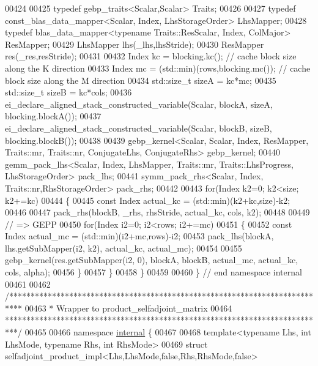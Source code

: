 \begin{DoxyCode}
00424 
00425     \textcolor{keyword}{typedef} gebp\_traits<Scalar,Scalar> Traits;
00426 
00427     \textcolor{keyword}{typedef} const\_blas\_data\_mapper<Scalar, Index, LhsStorageOrder> LhsMapper;
00428     \textcolor{keyword}{typedef} blas\_data\_mapper<typename Traits::ResScalar, Index, ColMajor> ResMapper;
00429     LhsMapper lhs(\_lhs,lhsStride);
00430     ResMapper res(\_res,resStride);
00431 
00432     Index kc = blocking.kc();                   \textcolor{comment}{// cache block size along the K direction}
00433     Index mc = (std::min)(rows,blocking.mc());  \textcolor{comment}{// cache block size along the M direction}
00434     std::size\_t sizeA = kc*mc;
00435     std::size\_t sizeB = kc*cols;
00436     ei\_declare\_aligned\_stack\_constructed\_variable(Scalar, blockA, sizeA, blocking.blockA());
00437     ei\_declare\_aligned\_stack\_constructed\_variable(Scalar, blockB, sizeB, blocking.blockB());
00438 
00439     gebp\_kernel<Scalar, Scalar, Index, ResMapper, Traits::mr, Traits::nr, ConjugateLhs, ConjugateRhs> 
      gebp\_kernel;
00440     gemm\_pack\_lhs<Scalar, Index, LhsMapper, Traits::mr, Traits::LhsProgress, LhsStorageOrder> pack\_lhs;
00441     symm\_pack\_rhs<Scalar, Index, Traits::nr,RhsStorageOrder> pack\_rhs;
00442 
00443     \textcolor{keywordflow}{for}(Index k2=0; k2<size; k2+=kc)
00444     \{
00445       \textcolor{keyword}{const} Index actual\_kc = (std::min)(k2+kc,size)-k2;
00446 
00447       pack\_rhs(blockB, \_rhs, rhsStride, actual\_kc, cols, k2);
00448 
00449       \textcolor{comment}{// => GEPP}
00450       \textcolor{keywordflow}{for}(Index i2=0; i2<rows; i2+=mc)
00451       \{
00452         \textcolor{keyword}{const} Index actual\_mc = (std::min)(i2+mc,rows)-i2;
00453         pack\_lhs(blockA, lhs.getSubMapper(i2, k2), actual\_kc, actual\_mc);
00454 
00455         gebp\_kernel(res.getSubMapper(i2, 0), blockA, blockB, actual\_mc, actual\_kc, cols, alpha);
00456       \}
00457     \}
00458   \}
00459 
00460 \} \textcolor{comment}{// end namespace internal}
00461 
00462 \textcolor{comment}{/***************************************************************************}
00463 \textcolor{comment}{* Wrapper to product\_selfadjoint\_matrix}
00464 \textcolor{comment}{***************************************************************************/}
00465 
00466 \textcolor{keyword}{namespace }\hyperlink{namespaceinternal}{internal} \{
00467   
00468 \textcolor{keyword}{template}<\textcolor{keyword}{typename} Lhs, \textcolor{keywordtype}{int} LhsMode, \textcolor{keyword}{typename} Rhs, \textcolor{keywordtype}{int} RhsMode>
00469 \textcolor{keyword}{struct }selfadjoint\_product\_impl<Lhs,LhsMode,false,Rhs,RhsMode,false>

\end{DoxyCode}

